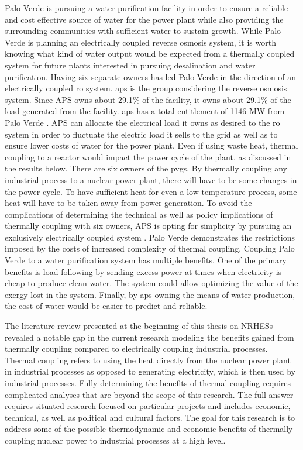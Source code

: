 Palo Verde is pursuing a water purification facility in order to ensure a reliable and cost effective source of water for the power plant while also providing the surrounding communities with sufficient water to sustain growth. While Palo Verde is planning an electrically coupled reverse osmosis system, it is worth knowing what kind of water output would be expected from a thermally coupled system for future plants interested in pursuing desalination and water purification. Having six separate owners has led Palo Verde in the direction of an electrically coupled \ac{ro} system. \ac{aps} is the group considering the reverse osmosis system.  Since APS owns about 29.1\% of the facility, it owns about 29.1\% of the load generated from the facility. \ac{aps} has a total entitlement of 1146 MW from Palo Verde \cite{PinnacleWestCapitalCorporation2016}. APS can allocate the electrical load it owns as desired to the \ac{ro} system in order to fluctuate the electric load it sells to the grid as well as to ensure lower costs of water for the power plant. Even if using waste heat, thermal coupling to a reactor would impact the power cycle of the plant, as discussed in the results below. There are six owners of the \ac{pvgs}.  By thermally coupling any industrial process to a nuclear power plant, there will have to be some changes in the power cycle.  To have sufficient heat for even a low temperature process, some heat will have to be taken away from power generation. To avoid the complications of determining the technical as well as policy implications of thermally coupling with six owners, APS is opting for simplicity by pursuing an exclusively electrically coupled system \cite{Brown2018}.  Palo Verde demonstrates the restrictions imposed by the costs of increased complexity of thermal coupling. Coupling Palo Verde to a water purification system has multiple benefits.  One of the primary benefits is load following by sending excess power at times when electricity is cheap to produce clean water. The system could allow optimizing the value of the exergy lost in the system. Finally, by \ac{aps} owning the means of water production, the cost of water would be easier to predict and reliable. 


The literature review presented at the beginning of this thesis on NRHESs revealed a notable gap in the current research modeling the benefits gained from thermally coupling compared to electrically coupling industrial processes. Thermal coupling refers to using the heat directly from the nuclear power plant in industrial processes as opposed to generating electricity, which is then used by industrial processes. Fully determining the benefits of thermal coupling requires complicated analyses that are beyond the scope of this research. The full answer requires situated research focused on particular projects and includes economic, technical, as well as political and cultural factors. The goal for this research is to address some of the possible thermodynamic and economic benefits of thermally coupling nuclear power to industrial processes at a high level. 

